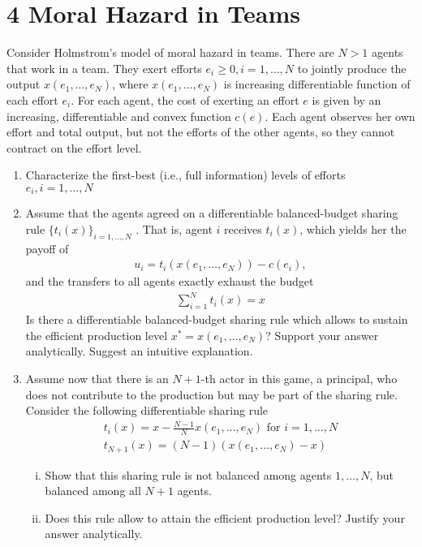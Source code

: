 \documentclass[a4paper]{article}
\begin{document}
\section*{4 Moral Hazard in Teams}
	Consider Holmstrom's model of moral hazard in teams. There are $N > 1$ agents that
	work in a team. They exert efforts $e_i \ge 0, i = 1, \dots,N$ to jointly produce the output $x(e_1,\dots, e_N )$, where $x(e_1,\dots,  e_N )$ is increasing differentiable function of each effort $e_i$. For each agent,
	the cost of exerting an effort $e$ is given by an increasing, differentiable and convex function
	$c(e)$. Each agent observes her own effort and total output, but not the efforts of the other
	agents, so they cannot contract on the effort level.
	\begin{enumerate}
	\item Characterize the first-best (i.e., full information) levels of efforts $e_i, i = 1, \dots, N$
	\item Assume that the agents agreed on a differentiable balanced-budget sharing rule
	$\{t_i(x)\}_{i=1, \dots, N}$ . That is, agent $i$ receives $t_i(x)$, which yields her the payoff of
	\begin{align*}
	u_i = t_i(x(e_1, \dots, e_N )) - c(e_i),
	\end{align*}
	and the transfers to all agents exactly exhaust the budget
	\begin{align}
	\sum_{i=1}^N t_i(x) = x
	\end{align}
	Is there a differentiable balanced-budget sharing rule which allows to sustain the
	efficient production level $x^*= x(e_1,\dots,e_N )$? Support your answer analytically.
	Suggest an intuitive explanation.
	\item Assume now that there is an $N + 1$-th actor in this game, a principal, who does
	not contribute to the production but may be part of the sharing rule. Consider the
	following differentiable sharing rule
	\begin{align}
	t_i(x) = x - \frac{N-1}{N}x(e_1,\dots, e_N) \text{ for } i = 1, \dots, N\\
	t_{N+1}(x) = (N-1)(x(e_1, \dots, e_N) - x) 
	\end{align}
	\begin{enumerate}[i.]
	\item Show that this sharing rule is not balanced among agents $1, \dots, N$, but balanced
	among all $N + 1$ agents.
	\item  Does this rule allow to attain the efficient production level? Justify your answer analytically.

\end{enumerate}
\end{enumerate}
\end{document}
